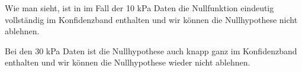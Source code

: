 \documentclass[12pt,a4paper]{article}
\theoremstyle{definition}
\theoremstyle{definition}
\theoremstyle{definition}
\theoremstyle{definition}
\begin{document}
Wie man sieht, ist in im Fall der 10 kPa Daten die Nullfunktion eindeutig vollständig im Konfidenzband enthalten und wir können die Nullhypothese nicht ablehnen.

Bei den 30 kPa Daten ist die Nullhypothese auch knapp ganz im Konfidenzband enthalten und wir können die Nullhypothese wieder nicht ablehnen.









\end{document}
